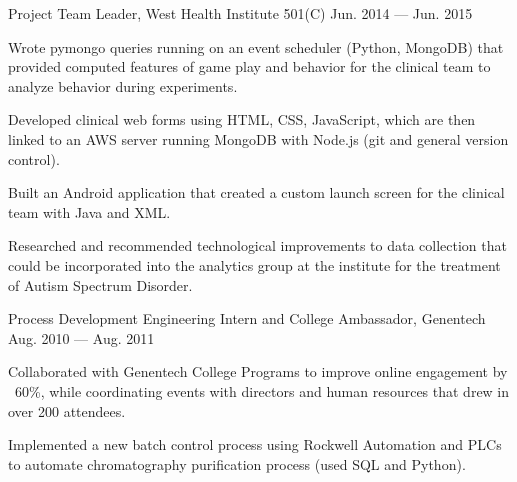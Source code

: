 \begin{cventries}
    \cvproject
    {Project Team Leader, West Health Institute 501(C)} %
    {Jun. 2014 --- Jun. 2015} %
    {
      \begin{cvitems} %
        \item{Wrote pymongo queries running on an event scheduler (Python, MongoDB) that provided computed features of game play and behavior for the clinical team to analyze behavior during experiments.}
        \item{Developed clinical web forms using HTML, CSS, JavaScript, which are then linked to an AWS server running MongoDB with Node.js (git and general version control).}
        \item{Built an Android application that created a custom launch screen for the clinical team with Java and XML.}
        \item{Researched and recommended technological improvements to data collection that could be incorporated into the analytics group at the institute for the treatment of Autism Spectrum Disorder.}
      \end{cvitems}
    }
    \newline
    
    \cvproject
    {Process Development Engineering Intern and College Ambassador, Genentech} %
    {Aug. 2010 --- Aug. 2011} %
    {
      \begin{cvitems} %
        \item{Collaborated with Genentech College Programs to improve online engagement by ~60\%, while coordinating events with directors and human resources that drew in over 200 attendees.}
        \item{Implemented a new batch control process using Rockwell Automation and PLCs to automate chromatography purification process (used SQL and Python).}
      \end{cvitems}
    }
 \end{cventries}